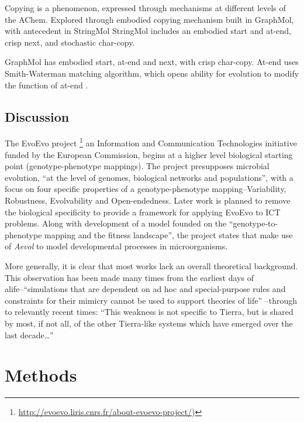 \begin{NOTES}
Copying is a phenomenon, expressed through mechanisms at different levels of the AChem. Explored through embodied copying mechanism built in GraphMol, with antecedent in StringMol \parencite{Hickinbotham2011}
StringMol includes an embodied start and at-end, crisp next, and stochastic char-copy. 

GraphMol has embodied start, at-end and next, with crisp char-copy. At-end uses Smith-Waterman matching algorithm, which opens ability for evolution to modify the function of at-end \parencite[p.143]{Nellis2012}. 
\end{NOTES}

\section{Discussion}
\begin{NOTES}
The EvoEvo project \footnote{\url{http://evoevo.liris.cnrs.fr/about-evoevo-project/})} an Information and Communication Technologies initiative funded by the European Commission, begins at a higher level biological starting point (genotype-phenotype mappings). The project presupposes microbial evolution, ``at the level of genomes, biological networks and populations'', with a focus on four specific properties of a genotype-phenotype mapping--Variability, Robustness, Evolvability and Open-endedness. Later work is planned to remove the biological specificity to provide a framework for applying EvoEvo to ICT problems. Along with development of a model founded on the ``genotype-to-phenotype mapping and the fitness landscape'', the project states that make use of \emph{Aevol} \parencite{Knibbe:2006vn,Knibbe:2007kx} to model developmental processes in microorganisms.

More generally, it is clear that most works lack an overall theoretical background. This observation has been made many times from the earliest days of \gls{alife}--``simulations that are dependent on ad hoc and special-purpose rules and constraints for their mimicry cannot be used to support theories of life''  \parencite{Pattee1988}--through to relevantly recent times: ``This weakness is not specific to Tierra, but is shared by most, if not all, of the other Tierra-like systems which have emerged over the last decade\ldots{}'' \parencite{Taylor2001}
\end{NOTES}

\chapter{Methods}\label{methods}


